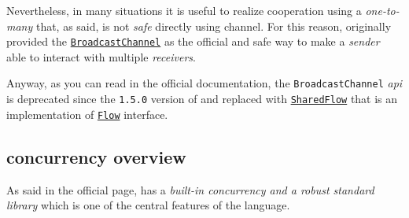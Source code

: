 Nevertheless, in many situations it is useful to realize cooperation using a \textit{one-to-many} that, as said, is not \textit{safe} directly using channel. For this reason, \Kotlin originally provided the \href{https://kotlinlang.org/api/kotlinx.coroutines/kotlinx-coroutines-core/kotlinx.coroutines.channels/-broadcast-channel/}{\texttt{BroadcastChannel}} as the official and safe way to make a \textit{sender} able to interact with multiple \textit{receivers}.

Anyway, as you can read in the official documentation, the \texttt{BroadcastChannel} \textit{api} is deprecated since the \texttt{1.5.0} version of \Kotlin and replaced with \href{https://kotlinlang.org/api/kotlinx.coroutines/kotlinx-coroutines-core/kotlinx.coroutines.flow/-shared-flow/}{\texttt{SharedFlow}} that is an implementation of \href{https://kotlinlang.org/api/kotlinx.coroutines/kotlinx-coroutines-core/kotlinx.coroutines.flow/-flow/}{\texttt{Flow}} interface.

\subsection{\Go concurrency overview}

As said in the official page, \Go has a \textit{built-in concurrency and a robust standard library} which is one of the central features of the language.

